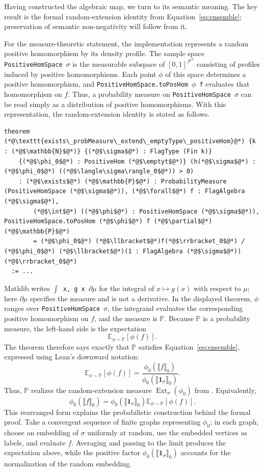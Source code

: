 \documentclass{article}
\newcommand{\lean}[1]{\texttt{#1}}
\newcommand{\emptyt}{\emptyset_{\mathrm{t}}}
\newcommand{\Ext}{\operatorname{Ext}}
\begin{document}
Having constructed the algebraic map, we turn to its semantic meaning.  The
key result is the formal random-extension identity from
Equation~\eqref{eq:ensemble}; preservation of semantic non-negativity will
follow from it.

For the measure-theoretic statement, the implementation represents a random
positive homomorphism by its density profile.  The sample space
\lean{PositiveHomSpace}~$\sigma$ is the measurable subspace of
\([0,1]^{\mathcal{F}^\sigma}\) consisting of profiles induced by positive
homomorphisms.  Each point $\phi$ of this space determines a positive
homomorphism, and \lean{PositiveHomSpace.toPosHom $\phi$ f} evaluates that
homomorphism on $f$.  Thus, a probability measure on
\lean{PositiveHomSpace}~$\sigma$ can be read simply as a distribution of
positive homomorphisms.  With this representation, the random-extension
identity is stated as follows.
\begin{lstlisting}
theorem (*@\texttt{exists\_probMeasure\_extend\_emptyType\_positiveHom}@*) {k : (*@$\mathbb{N}$@*)} {(*@$\sigma$@*) : FlagType (Fin k)}
    {(*@$\phi_0$@*) : PositiveHom (*@$\emptyt$@*)} (h(*@$\sigma$@*) : (*@$\phi_0$@*) ((*@$\langle\sigma\rangle_0$@*)) > 0)
    : (*@$\exists$@*) (*@$\mathbb{P}$@*) : ProbabilityMeasure (PositiveHomSpace (*@$\sigma$@*)), (*@$\forall$@*) f : FlagAlgebra (*@$\sigma$@*),
        (*@$\int$@*) ((*@$\phi$@*) : PositiveHomSpace (*@$\sigma$@*)), PositiveHomSpace.toPosHom (*@$\phi$@*) f (*@$\partial$@*)(*@$\mathbb{P}$@*)
        = (*@$\phi_0$@*) (*@$\llbracket$@*)f(*@$\rrbracket_0$@*) / (*@$\phi_0$@*) (*@$\llbracket$@*)(1 : FlagAlgebra (*@$\sigma$@*))(*@$\rrbracket_0$@*)
  := ...
\end{lstlisting}
Mathlib writes \lean{$\int$ x, g x $\partial\mu$} for the integral of
$x\mapsto g(x)$ with respect to $\mu$; here $\partial\mu$ specifies the
measure and is not a derivative.  In the displayed theorem, $\phi$ ranges over
\lean{PositiveHomSpace}~$\sigma$, the integrand evaluates the corresponding
positive homomorphism on $f$, and the measure is $\mathbb{P}$.  Because
$\mathbb{P}$ is a probability measure, the left-hand side is the expectation
\[
  \mathbb{E}_{\phi\sim \mathbb{P}}[\phi(f)].
\]
The theorem therefore says exactly that $\mathbb{P}$ satisfies
Equation~\eqref{eq:ensemble}, expressed using Lean's downward notation:
\[
  \mathbb{E}_{\phi\sim \mathbb{P}}[\phi(f)]
  =
  \frac{\phi_0(\llbracket f\rrbracket_0)}
       {\phi_0(\llbracket \mathbf{1}_\sigma\rrbracket_0)} .
\]
Thus, $\mathbb{P}$ realizes the random-extension measure
$\Ext_\sigma(\phi_0)$ from .  Equivalently,
\[
  \phi_0(\llbracket f\rrbracket_0)
  =
  \phi_0(\llbracket \mathbf{1}_\sigma\rrbracket_0)
  \mathbb{E}_{\phi\sim\mathbb{P}}[\phi(f)].
\]
This rearranged form explains the probabilistic construction behind the
formal proof.  Take a convergent sequence of finite graphs representing
$\phi_0$; in each graph, choose an embedding of $\sigma$ uniformly at random,
use the embedded vertices as labels, and evaluate $f$.  Averaging and passing
to the limit produces the expectation above, while the positive factor
$\phi_0(\llbracket \mathbf{1}_\sigma\rrbracket_0)$ accounts for the
normalization of the random embedding.
\end{document}
